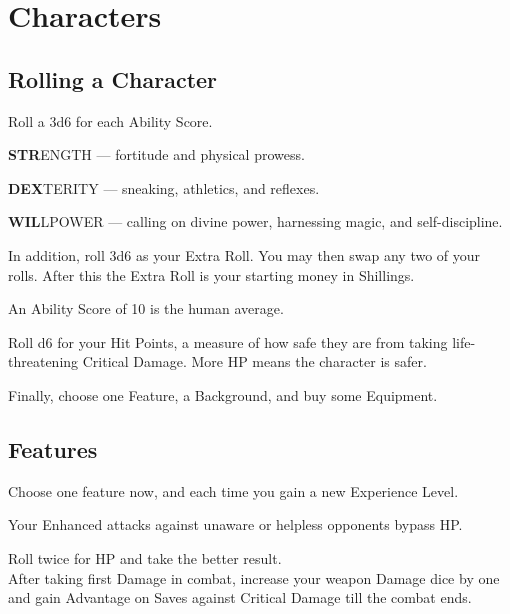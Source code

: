 \documentclass[itdr]{subfiles}
\begin{document}
\chapter{Characters}
\resetHeaders

\section{Rolling a Character}

Roll a 3d6 for each Ability Score.

\vspace{1em}

\textbf{STR}ENGTH --- fortitude and physical prowess.

\textbf{DEX}TERITY --- sneaking, athletics, and reflexes.

\textbf{WIL}LPOWER --- calling on divine power, harnessing magic, and self-discipline.

\vspace{1em}

In addition, roll 3d6 as your Extra Roll. You may then swap any two of your rolls. After this the Extra Roll is your starting money in Shillings.

An Ability Score of 10 is the human average.

Roll d6 for your Hit Points, a measure of how safe they are from taking life-threatening Critical Damage. More HP means the character is safer.

Finally, choose one Feature, a Background, and buy some Equipment.


\section{Features}

Choose one feature now, and each time you gain a new Experience Level.

Your Enhanced attacks against unaware or helpless opponents bypass HP.

 Roll twice for HP and take the better result.\\
After taking first Damage in combat, increase your weapon Damage dice by one and gain Advantage on Saves against Critical Damage till the combat ends.
\end{document}
